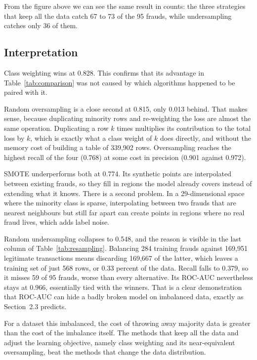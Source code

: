 From the figure above we can see the same result in counts: the three strategies that keep
all the data catch 67 to 73 of the 95 frauds, while undersampling catches only 36 of them.

\subsection{Interpretation}

Class weighting wins at 0.828. This confirms that its advantage in
Table~\ref{tab:comparison} was not caused by which algorithms happened to be paired with it.

Random oversampling is a close second at 0.815, only 0.013 behind. That makes
sense, because duplicating minority rows and re-weighting the loss are almost the same
operation. Duplicating a row $k$ times multiplies its contribution to the total loss by $k$,
which is exactly what a class weight of $k$ does directly, and without the memory cost of
building a table of 339{,}902 rows. Oversampling reaches the highest recall of the four
(0.768) at some cost in precision (0.901 against 0.972).

SMOTE underperforms both at 0.774. Its synthetic points are interpolated between
existing frauds, so they fill in regions the model already covers instead of extending what
it knows. There is a second problem. In a 29-dimensional space where the minority class is
sparse, interpolating between two frauds that are nearest neighbours but still far apart can
create points in regions where no real fraud lives, which adds label noise.

Random undersampling collapses to 0.548, and the reason is visible in the last
column of Table~\ref{tab:resampling}. Balancing 284 training frauds against 169{,}951
legitimate transactions means discarding 169{,}667 of the latter, which leaves a training
set of just 568 rows, or 0.33 percent of the data. Recall falls to 0.379, so it
misses 59 of 95 frauds, worse than every alternative. Its ROC-AUC nevertheless stays at
0.966, essentially tied with the winners. That is a clear demonstration that ROC-AUC can
hide a badly broken model on imbalanced data, exactly as Section~2.3 predicts.

For a dataset this imbalanced, the cost of throwing away majority data is greater than the
cost of the imbalance itself. The methods that keep all the data and adjust the learning
objective, namely class weighting and its near-equivalent oversampling, beat the methods
that change the data distribution.

